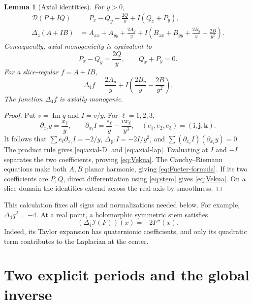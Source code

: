 \documentclass[11pt,a4paper]{article}
\numberwithin{equation}{section}
\newtheorem{lemma}[theorem]{Lemma}
\theoremstyle{definition}
\theoremstyle{remark}
\newcommand{\R}{\mathbb R}
\newcommand{\cI}{\mathcal I}
\newcommand{\cD}{\mathcal D}
\newcommand{\lap}{\Delta_4}
\newcommand{\Ima}{\operatorname{Im}}
\newcommand{\ii}{\mathbf i}
\newcommand{\jj}{\mathbf j}
\newcommand{\kk}{\mathbf k}
\begin{document}
\begin{lemma}[Axial identities]\label{lem:axial}
For $y>0$,
\begin{align}
 \cD(P+IQ)&=P_x-Q_y-\frac{2Q}{y}+I(Q_x+P_y),\label{eq:axial-D}\\
 \lap(A+IB)&=A_{xx}+A_{yy}+\frac{2A_y}{y}
 +I\left(B_{xx}+B_{yy}+\frac{2B_y}{y}-\frac{2B}{y^2}\right).
 \label{eq:axial-lap}
\end{align}
Consequently, axial monogenicity is equivalent to
\begin{equation}\label{eq:Vekua}
 P_x-Q_y=\frac{2Q}{y},\qquad Q_x+P_y=0.
\end{equation}
For a slice-regular $f=A+IB$,
\begin{equation}\label{eq:Fueter-formula}
 \lap f=\frac{2A_y}{y}
       +I\left(\frac{2B_y}{y}-\frac{2B}{y^2}\right).
\end{equation}
The function $\lap f$ is axially monogenic.
\end{lemma}
\begin{proof}
Put $v=\Ima q$ and $I=v/y$. For $\ell=1,2,3$,
\[
 \partial_{x_\ell}y=\frac{x_\ell}{y},\qquad
 \partial_{x_\ell}I=\frac{e_\ell}{y}-\frac{v x_\ell}{y^3},
 \quad (e_1,e_2,e_3)=(\ii,\jj,\kk).
\]
It follows that
$\sum e_\ell\partial_{x_\ell}I=-2/y$,
$\Delta_{\R^3}I=-2I/y^2$, and
$\sum(\partial_{x_\ell}I)(\partial_{x_\ell}y)=0$.
The product rule gives \eqref{eq:axial-D} and \eqref{eq:axial-lap}.
Evaluating at $I$ and $-I$ separates the two coefficients, proving
\eqref{eq:Vekua}. The Cauchy--Riemann equations make both $A,B$ planar
harmonic, giving \eqref{eq:Fueter-formula}. If its two coefficients are $P,Q$,
direct differentiation using \eqref{eq:stem} gives \eqref{eq:Vekua}.
On a slice domain the identities extend across the real axis by smoothness.
\end{proof}
This calculation fixes all signs and normalizations needed below. For example,
$\lap q^2=-4$. At a real point, a holomorphic symmetric stem satisfies
\begin{equation}\label{eq:real-trace}
 (\lap\cI(F))(x)=-2F''(x).
\end{equation}
Indeed, its Taylor expansion has quaternionic coefficients, and only its
quadratic term contributes to the Laplacian at the center.

\section{Two explicit periods and the global inverse}
\label{sec:periods}
\end{document}

